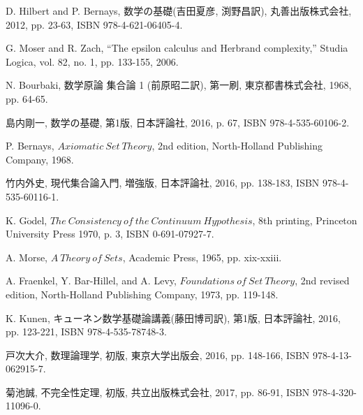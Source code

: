 \begin{thebibliography}{数字}
	 D. Hilbert and P. Bernays, 数学の基礎(吉田夏彦, 渕野昌訳), 丸善出版株式会社, 2012, pp. 23-63, ISBN 978-4-621-06405-4.
	
	 G. Moser and R. Zach, ``The epsilon calculus and Herbrand complexity,''
		Studia Logica, vol. 82, no. 1, pp. 133-155, 2006.
	
	
	 N. Bourbaki, 数学原論 集合論 1 (前原昭二訳), 第一刷, 東京都書株式会社, 1968, pp. 64-65.
	
	 島内剛一, 数学の基礎, 第1版, 日本評論社, 2016, p. 67, ISBN 978-4-535-60106-2.
	
	 P. Bernays, $Axiomatic\ Set\ Theory$, 2nd edition, North-Holland Publishing Company, 1968. 
	
	 竹内外史, 現代集合論入門, 増強版, 日本評論社, 2016, pp. 138-183, ISBN 978-4-535-60116-1.
	
	 K. G$\ddot{\mbox{o}}$del, $The\ Consistency\ of\ the\ Continuum\ Hypothesis$, 8th printing, Princeton University Press 1970, p. 3, ISBN 0-691-07927-7.
	
	 A. Morse, $A\ Theory\ of\ Sets$, Academic Press, 1965, pp. xix-xxiii.
	
	 A. Fraenkel, Y. Bar-Hillel, and A. Levy, $Foundations\ of\ Set\ Theory$, 2nd revised edition, North-Holland Publishing Company, 1973, pp. 119-148.
	
	
	 K. Kunen, キューネン数学基礎論講義(藤田博司訳), 第1版, 日本評論社, 2016, pp. 123-221, ISBN 978-4-535-78748-3. 
	
	
	 戸次大介, 数理論理学, 初版, 東京大学出版会, 2016, pp. 148-166, ISBN 978-4-13-062915-7.
	
	 菊池誠, 不完全性定理, 初版, 共立出版株式会社, 2017, pp. 86-91, ISBN 978-4-320-11096-0.
	
\end{thebibliography}